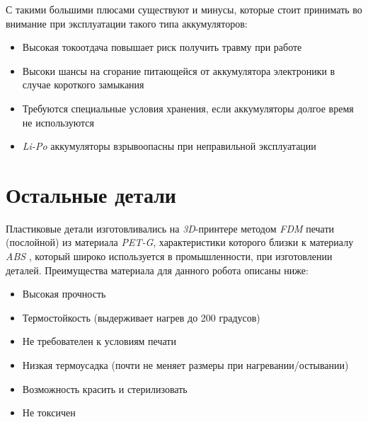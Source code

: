 С такими большими плюсами существуют и минусы, которые стоит принимать во внимание при эксплуатации такого типа аккумуляторов:
\begin{itemize}
    \item Высокая токоотдача повышает риск получить травму при работе
    \item Высоки шансы на сгорание питающейся от аккумулятора электроники в случае короткого замыкания
    \item Требуются специальные условия хранения, если аккумуляторы долгое время не используются
    \item \textit{Li-Po} аккумуляторы взрывоопасны при неправильной эксплуатации
\end{itemize}


\section{Остальные детали}
Пластиковые детали изготовливались на \textit{3D}-принтере методом \textit{FDM} печати (послойной) из материала \textit{PET-G}, характеристики которого близки к материалу \textit{ABS} \cite{Filament2017}, который широко используется в промышленности, при изготовлении деталей. Преимущества материала для данного робота описаны ниже:
\begin{itemize} %
    \item Высокая прочность %
    \item Термостойкость (выдерживает нагрев до 200 градусов)
    \item Не требователен к условиям печати
    \item Низкая термоусадка (почти не меняет размеры при нагревании/остывании)
    \item Возможность красить и стерилизовать
    \item Не токсичен
\end{itemize}
